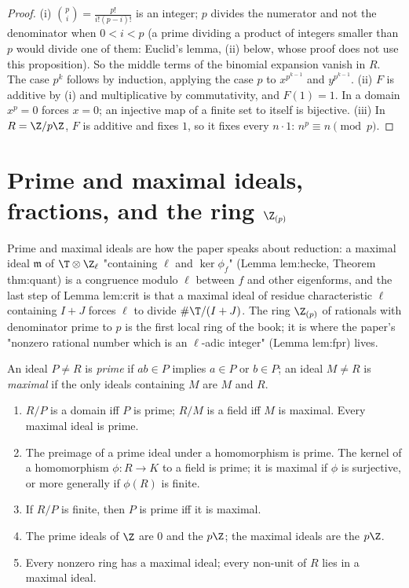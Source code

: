 \begin{proof}
(i) $\binom pi=\frac{p!}{i!(p-i)!}$ is an integer; $p$ divides the numerator and not the denominator when $0<i<p$ (a prime
dividing a product of integers smaller than $p$ would divide one of them: Euclid's lemma, (ii) below, whose
proof does not use this proposition). So the middle terms
of the binomial expansion vanish in $R$. The case $p^k$ follows by induction, applying the case $p$ to $x^{p^{k-1}}$ and $y^{p^{k-1}}$.
(ii) $F$ is additive by (i) and multiplicative by commutativity, and $F(1)=1$. In a domain $x^p=0$ forces $x=0$; an injective
map of a finite set to itself is bijective.
(iii) In $R=\Z/p\Z$, $F$ is additive and fixes $1$, so it fixes every $n\cdot1$: $n^p\equiv n\pmod p$.
\end{proof}

\section[Prime and maximal ideals, fractions, \texorpdfstring{$\Z_{(p)}$}{Z(p)}]{Prime and maximal ideals, fractions, and the ring \texorpdfstring{$\Z_{(p)}$}{Z(p)}}\label{sec:rings:primes}

Prime and maximal ideals are how the paper speaks about reduction: a maximal ideal $\mathfrak m$ of $\T\otimes\Z_\ell$ "containing
$\ell$ and $\ker\phi_f$" (Lemma lem:hecke, Theorem thm:quant) is a congruence modulo $\ell$ between $f$ and other eigenforms,
and the last step of Lemma lem:crit is that a maximal ideal of residue characteristic $\ell$ containing $I+J$ forces $\ell$
to divide $\#\T/(I+J)$. The ring $\Z_{(p)}$ of rationals with denominator prime to $p$ is the first local ring of the
book; it is where the paper's "nonzero rational number which is an $\ell$-adic integer" (Lemma lem:fpr) lives.

\begin{theorem}\label{thm:rings:prime-maximal}
An ideal $P\ne R$ is \emph{prime} if $ab\in P$ implies $a\in P$ or $b\in P$; an ideal $M\ne R$ is \emph{maximal} if the only ideals
containing $M$ are $M$ and $R$.
\begin{enumerate}[label=(\roman*)]
\item $R/P$ is a domain iff $P$ is prime; $R/M$ is a field iff $M$ is maximal. Every maximal ideal is prime.
\item The preimage of a prime ideal under a homomorphism is prime. The kernel of a homomorphism $\phi\colon R\to K$ to a field is
prime; it is maximal if $\phi$ is surjective, or more generally if $\phi(R)$ is finite.
\item If $R/P$ is finite, then $P$ is prime iff it is maximal.
\item The prime ideals of $\Z$ are $0$ and the $p\Z$; the maximal ideals are the $p\Z$.
\item Every nonzero ring has a maximal ideal; every non-unit of $R$ lies in a maximal ideal.
\end{enumerate}
\end{theorem}


